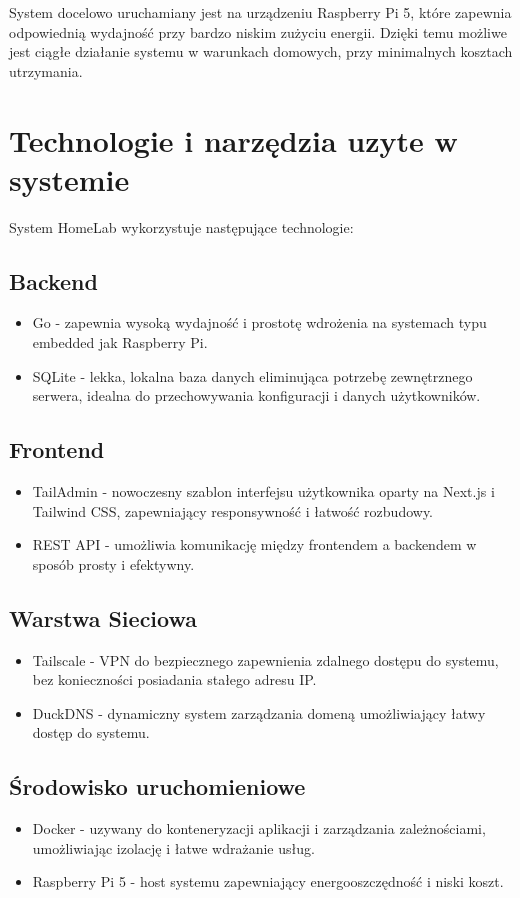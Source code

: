 System docelowo uruchamiany jest na urządzeniu Raspberry Pi 5, które zapewnia odpowiednią wydajność przy bardzo niskim zużyciu energii. Dzięki temu możliwe jest ciągłe działanie systemu w warunkach domowych, przy minimalnych kosztach utrzymania.
\section{Technologie i narzędzia uzyte w systemie}

System HomeLab wykorzystuje następujące technologie:
\subsection{Backend}
\begin{itemize}
    \item Go - zapewnia wysoką wydajność i prostotę wdrożenia na systemach typu embedded jak Raspberry Pi.
    \item SQLite - lekka, lokalna baza danych eliminująca potrzebę zewnętrznego serwera, idealna do przechowywania konfiguracji i danych użytkowników.
\end{itemize}
\subsection{Frontend}
\begin{itemize}
    \item TailAdmin - nowoczesny szablon interfejsu użytkownika oparty na Next.js i Tailwind CSS, zapewniający responsywność i łatwość rozbudowy.
    \item REST API - umożliwia komunikację między frontendem a backendem w sposób prosty i efektywny.
\end{itemize}
\subsection{Warstwa Sieciowa}
\begin{itemize}
    \item Tailscale - VPN do bezpiecznego zapewnienia zdalnego dostępu do systemu, bez konieczności posiadania stałego adresu IP.
    \item DuckDNS - dynamiczny system zarządzania domeną umożliwiający łatwy dostęp do systemu.
\end{itemize}
\subsection{Środowisko uruchomieniowe}
\begin{itemize}
    \item Docker - uzywany do konteneryzacji aplikacji i zarządzania zależnościami, umożliwiając izolację i łatwe wdrażanie usług.
    \item Raspberry Pi 5 - host systemu zapewniający energooszczędność i niski koszt.
\end{itemize}
